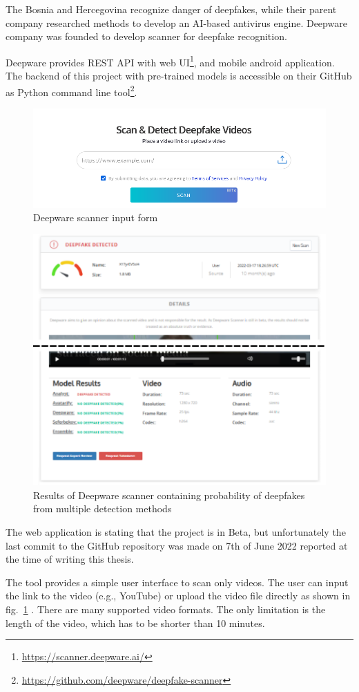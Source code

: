 The Bosnia and Hercegovina recognize danger of deepfakes, while their parent company researched methods to develop an AI-based antivirus engine. Deepware company was founded to develop scanner for deepfake recognition.

Deepware provides REST API with web UI\footnote{\url{https://scanner.deepware.ai/}}, and mobile android application. The backend of this project with pre-trained models is accessible on their GitHub as Python command line tool\footnote{\url{ https://github.com/deepware/deepfake-scanner}}.

\begin{figure}[H]
    \centering
    \includegraphics[width=.65\linewidth]{other-fig/deepware_input.png}
    \caption{Deepware scanner input form}
    \label{fig:deepware_input}
\end{figure}

\begin{figure}[H]
    \centering
    \includegraphics[width=.6\linewidth]{other-fig/deepware_results.png}
    \caption{Results of Deepware scanner containing probability of deepfakes from multiple detection methods}
    \label{fig:deepware_results}
\end{figure}

The web application is stating that the project is in Beta, but unfortunately the last commit to the GitHub repository was made on 7th of June 2022 reported at the time of writing this thesis.

The tool provides a simple user interface to scan only videos. The user can input the link to the video (e.g., YouTube) or upload the video file directly as shown in fig.~\ref{fig:deepware_input} . There are many supported video formats. The only limitation is the length of the video, which has to be shorter than 10 minutes.

